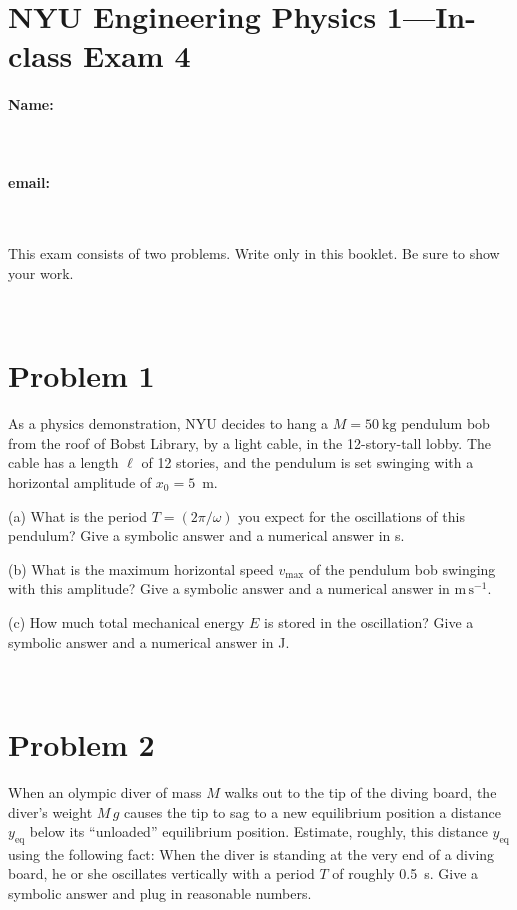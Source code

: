 \documentclass[12pt]{article}
\begin{document}
\section*{NYU Engineering Physics 1---In-class Exam 4}

\vfill

\paragraph{Name:} ~

\paragraph{email:} ~

\vfill

This exam consists of two problems.  Write only in this booklet.  Be
sure to show your work.

\vfill ~

\clearpage

\section*{Problem 1}

As a physics demonstration, NYU decides to hang a $M=50~\mathrm{kg}$
pendulum bob from the roof of Bobst Library, by a light cable, in the
12-story-tall lobby.  The cable has a length $\ell$ of 12 stories, and
the pendulum is set swinging with a horizontal amplitude of $x_0=5$~m.

(a) What is the period $T=(2\pi/\omega)$ you expect for the
oscillations of this pendulum?  Give a symbolic answer and a numerical
answer in s.

\vfill

(b) What is the maximum horizontal speed $v_\mathrm{max}$ of the
pendulum bob swinging with this amplitude?  Give a symbolic answer and
a numerical answer in $\mathrm{m\,s^{-1}}$.

\vfill

(c) How much total mechanical energy $E$ is stored in the oscillation?
Give a symbolic answer and a numerical answer in J.

\vfill ~

\clearpage

\section*{Problem 2}

When an olympic diver of mass $M$ walks out to the tip of the diving
board, the diver's weight $M\,g$ causes the tip to sag to a new
equilibrium position a distance $y_\mathrm{eq}$ below its ``unloaded''
equilibrium position.  Estimate, roughly, this distance
$y_\mathrm{eq}$ using the following fact: When the diver is standing
at the very end of a diving board, he or she oscillates vertically
with a period $T$ of roughly 0.5~s.  Give a symbolic answer and plug
in reasonable numbers.
\end{document}
